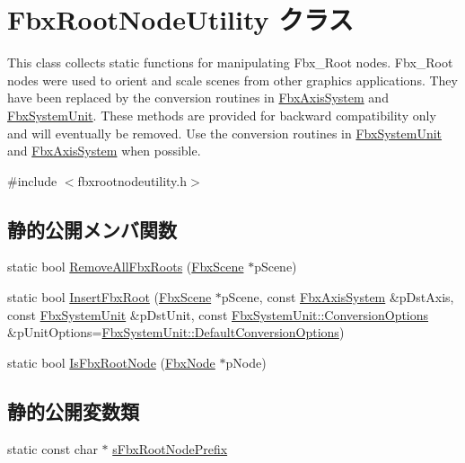 \hypertarget{class_fbx_root_node_utility}{}\section{Fbx\+Root\+Node\+Utility クラス}
\label{class_fbx_root_node_utility}


This class collects static functions for manipulating Fbx\+\_\+\+Root nodes. Fbx\+\_\+\+Root nodes were used to orient and scale scenes from other graphics applications. They have been replaced by the conversion routines in \hyperlink{class_fbx_axis_system}{Fbx\+Axis\+System} and \hyperlink{class_fbx_system_unit}{Fbx\+System\+Unit}. These methods are provided for backward compatibility only and will eventually be removed. Use the conversion routines in \hyperlink{class_fbx_system_unit}{Fbx\+System\+Unit} and \hyperlink{class_fbx_axis_system}{Fbx\+Axis\+System} when possible.  




{\ttfamily \#include $<$fbxrootnodeutility.\+h$>$}

\subsection*{静的公開メンバ関数}
\begin{DoxyCompactItemize}
\item 
static bool \hyperlink{class_fbx_root_node_utility_ac4729d0953e660d3163f22ba02df5092}{Remove\+All\+Fbx\+Roots} (\hyperlink{class_fbx_scene}{Fbx\+Scene} $\ast$p\+Scene)
\item 
static bool \hyperlink{class_fbx_root_node_utility_a0f691aaa73fe8e6dea97df81ac5e3517}{Insert\+Fbx\+Root} (\hyperlink{class_fbx_scene}{Fbx\+Scene} $\ast$p\+Scene, const \hyperlink{class_fbx_axis_system}{Fbx\+Axis\+System} \&p\+Dst\+Axis, const \hyperlink{class_fbx_system_unit}{Fbx\+System\+Unit} \&p\+Dst\+Unit, const \hyperlink{struct_fbx_system_unit_1_1_conversion_options}{Fbx\+System\+Unit\+::\+Conversion\+Options} \&p\+Unit\+Options=\hyperlink{class_fbx_system_unit_ae76376923416767b2a5f6a7e4e663064}{Fbx\+System\+Unit\+::\+Default\+Conversion\+Options})
\item 
static bool \hyperlink{class_fbx_root_node_utility_a4f6f1e747f3631fd370f98f3f4a02302}{Is\+Fbx\+Root\+Node} (\hyperlink{class_fbx_node}{Fbx\+Node} $\ast$p\+Node)
\end{DoxyCompactItemize}
\subsection*{静的公開変数類}
\begin{DoxyCompactItemize}
\item 
static const char $\ast$ \hyperlink{class_fbx_root_node_utility_aa98b95d282380953bafc151c4100fe17}{s\+Fbx\+Root\+Node\+Prefix}
\end{DoxyCompactItemize}
